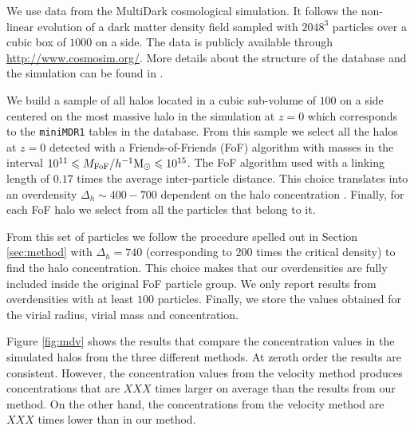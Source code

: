 \documentclass[useAMS,usenatbib]{mn2e}
\newcommand{\hMpc}{{\ifmmode{h^{-1}{\rm Mpc}}\else{$h^{-1}$Mpc }\fi}}
\newcommand{\hMsun}{{\ifmmode{h^{-1}{\rm
        {M_{\odot}}}}\else{$h^{-1}{\rm{M_{\odot}}}$~}\fi}}
\begin{document}
We use data from the MultiDark cosmological simulation.
It follows the non-linear evolution of a dark matter density field
sampled with $2048^3$ particles over a cubic box of $1000$ \hMpc on a side.
The data is publicly available through \url{http://www.cosmosim.org/}.
More details about the structure of the database and the simulation
can be found in \citep{2013AN....334..691R}.

We build a sample of all halos located in a cubic sub-volume of $100$
\hMpc on a side centered on the most massive halo in the simulation at
$z=0$ which corresponds to the \texttt{miniMDR1} tables in the
database.
From this sample we select all the halos at $z=0$ detected with a
Friends-of-Friends (FoF) algorithm with masses in the interval
$10^{11}\leq M_{\rm FoF}/\hMsun \leq 10^{15}$.
The FoF algorithm used with a linking length of $0.17$ times the average
inter-particle distance. This choice translates into an overdensity
$\Delta_h\sim 400-700$ dependent on the halo concentration
\citep{More2011}.
Finally, for each FoF halo we select from all the particles that
belong to it.

From this set of particles we follow the procedure spelled out in
Section \ref{sec:method} with $\Delta_h=740$  (corresponding to $200$
times the critical density) to find the halo concentration.
This choice makes that our overdensities are fully included inside the
original FoF particle group.
We only report results from overdensities with at least $100$ particles.
Finally, we store the values obtained for the virial radius, virial
mass and concentration.

Figure \ref{fig:mdv} shows the results that compare the concentration
values in the simulated halos from the three different methods.
At zeroth order the results are consistent.
However, the concentration values from the velocity method produces
concentrations that are $XXX$ times larger on average than the results
from our method.
On the other hand, the concentrations from the velocity method are
$XXX$ times lower than in our method.

\end{document}
